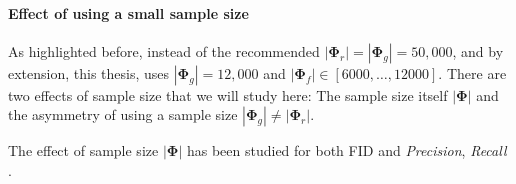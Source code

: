 

\paragraph{Effect of using a small sample size}

As highlighted before, instead of the recommended $|\boldsymbol{\Phi}_r| = |\boldsymbol{\Phi}_g| = 50{,}000$, \cite{jazbec_generative_2025} and by extension, this thesis, uses $|\boldsymbol\Phi_g| = 12{,}000$ and $|\boldsymbol\Phi_f| \in \left[6000,\dots, 12000\right]$. There are two effects of sample size that we will study here:
The sample size itself $|\boldsymbol{\Phi}|$ and the asymmetry of using a sample size $|\boldsymbol{\Phi}_g| \not= |\boldsymbol\Phi_r|$.

The effect of sample size $|\boldsymbol\Phi|$ has been studied for both \acs{FID} \parencite{jayasumana_rethinking_2024} and \emph{Precision}, \emph{Recall} \parencite{kynkaanniemi_improved_2019}.


